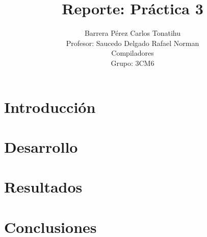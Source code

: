 \documentclass[titlepage]{article}
\title{Reporte: Práctica 3}
\author{Barrera Pérez Carlos Tonatihu \\ Profesor: Saucedo Delgado Rafael Norman \\ Compiladores \\ Grupo: 3CM6 }
\begin{document}
\maketitle
\tableofcontents
\section{Introducción}
\section{Desarrollo}
\section{Resultados}
\section{Conclusiones}
 
	
\end{document}
